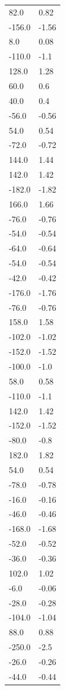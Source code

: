 \begin{longtable}{ll}
82.0 & 0.82 \\
-156.0 & -1.56 \\
8.0 & 0.08 \\
-110.0 & -1.1 \\
128.0 & 1.28 \\
60.0 & 0.6 \\
40.0 & 0.4 \\
-56.0 & -0.56 \\
54.0 & 0.54 \\
-72.0 & -0.72 \\
144.0 & 1.44 \\
142.0 & 1.42 \\
-182.0 & -1.82 \\
166.0 & 1.66 \\
-76.0 & -0.76 \\
-54.0 & -0.54 \\
-64.0 & -0.64 \\
-54.0 & -0.54 \\
-42.0 & -0.42 \\
-176.0 & -1.76 \\
-76.0 & -0.76 \\
158.0 & 1.58 \\
-102.0 & -1.02 \\
-152.0 & -1.52 \\
-100.0 & -1.0 \\
58.0 & 0.58 \\
-110.0 & -1.1 \\
142.0 & 1.42 \\
-152.0 & -1.52 \\
-80.0 & -0.8 \\
182.0 & 1.82 \\
54.0 & 0.54 \\
-78.0 & -0.78 \\
-16.0 & -0.16 \\
-46.0 & -0.46 \\
-168.0 & -1.68 \\
-52.0 & -0.52 \\
-36.0 & -0.36 \\
102.0 & 1.02 \\
-6.0 & -0.06 \\
-28.0 & -0.28 \\
-104.0 & -1.04 \\
88.0 & 0.88 \\
-250.0 & -2.5 \\
-26.0 & -0.26 \\
-44.0 & -0.44 \\

\end{longtable}
